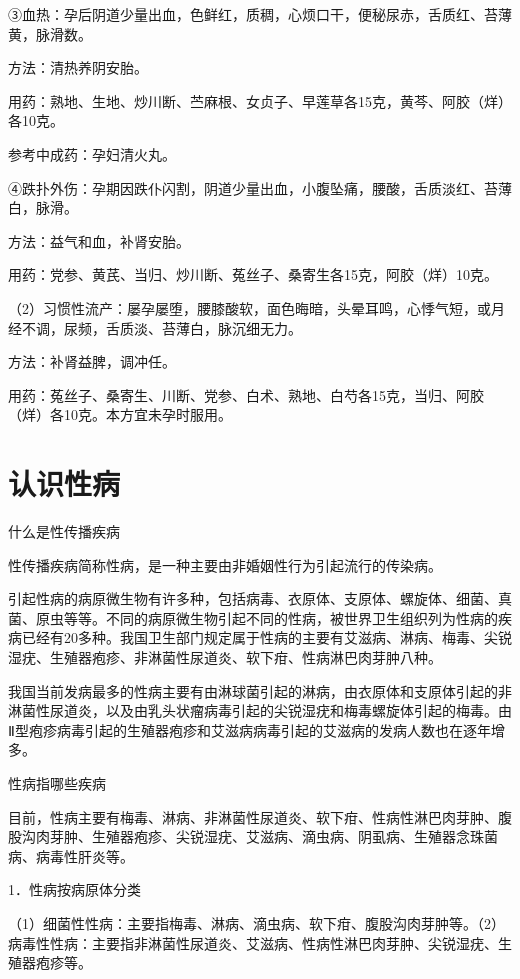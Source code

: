 \documentclass[12pt,UTF8,openany]{ctexbook}
\begin{document}
③血热：孕后阴道少量出血，色鲜红，质稠，心烦口干，便秘尿赤，舌质红、苔薄黄，脉滑数。

方法：清热养阴安胎。

用药：熟地、生地、炒川断、苎麻根、女贞子、早莲草各15克，黄芩、阿胶（烊）各10克。

参考中成药：孕妇清火丸。

④跌扑外伤：孕期因跌仆闪割，阴道少量出血，小腹坠痛，腰酸，舌质淡红、苔薄白，脉滑。

方法：益气和血，补肾安胎。

用药：党参、黄芪、当归、炒川断、菟丝子、桑寄生各15克，阿胶（烊）10克。

（2）习惯性流产：屡孕屡堕，腰膝酸软，面色晦暗，头晕耳鸣，心悸气短，或月经不调，尿频，舌质淡、苔薄白，脉沉细无力。

方法：补肾益脾，调冲任。

用药：菟丝子、桑寄生、川断、党参、白术、熟地、白芍各15克，当归、阿胶（烊）各10克。本方宜未孕时服用。





\chapter{认识性病}


什么是性传播疾病


性传播疾病简称性病，是一种主要由非婚姻性行为引起流行的传染病。

引起性病的病原微生物有许多种，包括病毒、衣原体、支原体、螺旋体、细菌、真菌、原虫等等。不同的病原微生物引起不同的性病，被世界卫生组织列为性病的疾病已经有20多种。我国卫生部门规定属于性病的主要有艾滋病、淋病、梅毒、尖锐湿疣、生殖器疱疹、非淋菌性尿道炎、软下疳、性病淋巴肉芽肿八种。

我国当前发病最多的性病主要有由淋球菌引起的淋病，由衣原体和支原体引起的非淋菌性尿道炎，以及由乳头状瘤病毒引起的尖锐湿疣和梅毒螺旋体引起的梅毒。由Ⅱ型疱疹病毒引起的生殖器疱疹和艾滋病病毒引起的艾滋病的发病人数也在逐年增多。





性病指哪些疾病


目前，性病主要有梅毒、淋病、非淋菌性尿道炎、软下疳、性病性淋巴肉芽肿、腹股沟肉芽肿、生殖器疱疹、尖锐湿疣、艾滋病、滴虫病、阴虱病、生殖器念珠菌病、病毒性肝炎等。

1．性病按病原体分类

（1）细菌性性病：主要指梅毒、淋病、滴虫病、软下疳、腹股沟肉芽肿等。（2）病毒性性病：主要指非淋菌性尿道炎、艾滋病、性病性淋巴肉芽肿、尖锐湿疣、生殖器疱疹等。
\end{document}

